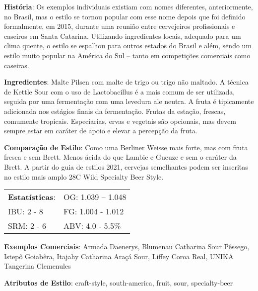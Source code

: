 \textbf{História}: Os exemplos individuais existiam com nomes diferentes, anteriormente, no Brasil, mas o estilo se tornou popular com esse nome depois que foi definido formalmente, em 2015, durante uma reunião entre cervejeiros profissionais e caseiros em Santa Catarina. Utilizando ingredientes locais, adequado para um clima quente, o estilo se espalhou para outros estados do Brasil e além, sendo um estilo muito popular na América do Sul – tanto em competições comerciais como caseiras.

\textbf{Ingredientes}: Malte Pilsen com malte de trigo ou trigo não maltado. A técnica de Kettle Sour com o uso de Lactobacillus é a mais comum de ser utilizada, seguida por uma fermentação com uma levedura ale neutra. A fruta é tipicamente adicionada nos estágios finais da fermentação. Frutas da estação, frescas, comumente tropicais. Especiarias, ervas e vegetais são opcionais, mas devem sempre estar em caráter de apoio e elevar a percepção da fruta.

\textbf{Comparação de Estilo}: Como uma Berliner Weisse mais forte, mas com fruta fresca e sem Brett. Menos ácida do que Lambic e Gueuze e sem o caráter da Brett. A partir do guia de estilos 2021, cervejas semelhantes podem ser inscritas no estilo mais amplo 28C Wild Specialty Beer Style.

\begin{tabular}{@{}p{35mm}p{35mm}@{}}
  \textbf{Estatísticas}: & OG: 1.039 – 1.048\\
  IBU: 2 - 8 & FG: 1.004 - 1.012 \\
  SRM: 2 - 6  & ABV: 4.0 - 5.5\%
\end{tabular}

\textbf{Exemplos Comerciais}: Armada Daenerys, Blumenau Catharina Sour Pêssego, Istepô Goiabêra, Itajahy Catharina Araçá Sour, Liffey Coroa Real, UNIKA Tangerina Clemenules

\textbf{Atributos de Estilo}: craft-style, south-america, fruit, sour, specialty-beer
